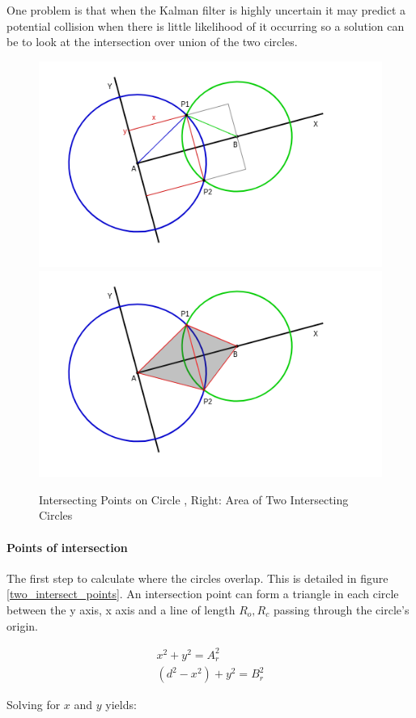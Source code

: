 \documentclass[11pt,twoside]{report}
\begin{document}
One problem is that when the Kalman filter is highly uncertain it may predict a potential collision when there is little likelihood of it occurring so a solution can be to look at the intersection over union of the two circles.

\noindent \begin{figure}[h!]
	\includegraphics[width = 0.5\hsize]{figures/points_intersecting_circles.png}
	\includegraphics[width = 0.5 \hsize]{figures/two_intersecting_circles.png}
	\caption{Intersecting Points on Circle \cite{circle_intersection_point}, Right: Area of Two Intersecting Circles \cite{circle_intersection}}
	\label{two_intersect_points}
	\label{two_intersect_circles}
\end{figure}

\paragraph{Points of intersection}
The first step to calculate where the circles overlap. This is detailed in figure \ref{two_intersect_points}. An intersection point can form a triangle in each circle between the y axis, x axis and a line of length $R_{o},R_{c}$ passing through the circle's origin.


\begin{equation}
\begin{aligned}
x^{2} + y^{2} = A_{r}^{2} \\
(d^{2}-x^{2}) + y^{2} = B_{r}^{2}
\end{aligned}
\label{inter_point_eq1}
\end{equation}


Solving for $x$ and $y$ yields:
\end{document}
